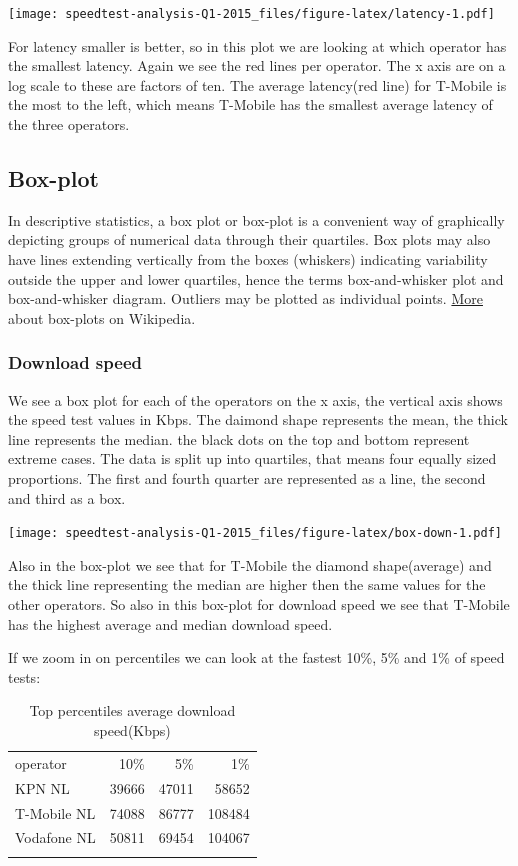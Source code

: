 \documentclass[]{article}
\begin{document}
\texttt{[image: speedtest-analysis-Q1-2015\_files/figure-latex/latency-1.pdf]}

For latency smaller is better, so in this plot we are looking at which
operator has the smallest latency. Again we see the red lines per
operator. The x axis are on a log scale to these are factors of ten. The
average latency(red line) for T-Mobile is the most to the left, which
means T-Mobile has the smallest average latency of the three operators.

\subsection{Box-plot}\label{box-plot}

In descriptive statistics, a box plot or box-plot is a convenient way of
graphically depicting groups of numerical data through their quartiles.
Box plots may also have lines extending vertically from the boxes
(whiskers) indicating variability outside the upper and lower quartiles,
hence the terms box-and-whisker plot and box-and-whisker diagram.
Outliers may be plotted as individual points.
\href{https://en.wikipedia.org/wiki/Box_plot}{More} about box-plots on
Wikipedia.

\subsubsection{Download speed}\label{download-speed-1}

We see a box plot for each of the operators on the x axis, the vertical
axis shows the speed test values in Kbps. The daimond shape represents
the mean, the thick line represents the median. the black dots on the
top and bottom represent extreme cases. The data is split up into
quartiles, that means four equally sized proportions. The first and
fourth quarter are represented as a line, the second and third as a box.

\texttt{[image: speedtest-analysis-Q1-2015\_files/figure-latex/box-down-1.pdf]}

Also in the box-plot we see that for T-Mobile the diamond shape(average)
and the thick line representing the median are higher then the same
values for the other operators. So also in this box-plot for download
speed we see that T-Mobile has the highest average and median download
speed.

If we zoom in on percentiles we can look at the fastest 10\%, 5\% and
1\% of speed tests:

\begin{longtable}[c]{@{}lrrr@{}}
\toprule\addlinespace
operator & 10\% & 5\% & 1\%
\\\addlinespace
\midrule\endhead
KPN NL & 39666 & 47011 & 58652
\\\addlinespace
T-Mobile NL & 74088 & 86777 & 108484
\\\addlinespace
Vodafone NL & 50811 & 69454 & 104067
\\\addlinespace
\bottomrule
\addlinespace
\caption{Top percentiles average download speed(Kbps)}
\end{longtable}
\end{document}
